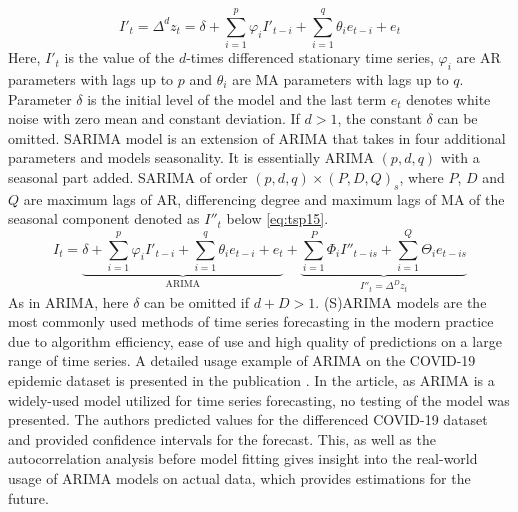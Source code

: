 \documentclass[3p,times,procedia]{elsarticle}
\begin{document}
\begin{enumerate}
\begin{equation} \label{eq:tsp14}
I'_t = \Delta^d z_t = \delta + \sum_{i=1}^p \varphi_i I'_{t-i} + \sum_{i=1}^q \theta_i e_{t-i} + e_t
\end{equation}
Here, $I'_t$ is the value of the $d$-times differenced stationary time series, $\varphi_i$ are AR parameters with lags up to $p$ and $\theta_i$ are MA parameters with lags up to $q$. Parameter $\delta$ is the initial level of the model and the last term $e_t$ denotes white noise with zero mean and constant deviation. If $d>1$, the constant $\delta$ can be omitted.
SARIMA model is an extension of ARIMA that takes in four additional parameters and models seasonality. It is essentially ARIMA $(p,d,q)$ with a seasonal part added. SARIMA of order $(p,d,q)\times (P,D,Q)_s$, where $P$, $D$ and $Q$ are maximum lags of AR, differencing degree and maximum lags of MA of the seasonal component denoted as $I''_t$ below \ref{eq:tsp15}.
\begin{equation} \label{eq:tsp15}
I_t = \underbrace{\delta + \sum_{i=1}^p \varphi_i I'_{t-i} + \sum_{i=1}^q \theta_i e_{t-i} + e_t}_{\mathrm{ARIMA}} + \underbrace{\sum_{i=1}^P \Phi_i I''_{t-is} + \sum_{i=1}^Q \Theta_i e_{t-is}}_{I''_t = \Delta^D z_t}
\end{equation}
As in ARIMA, here $\delta$ can be omitted if $d+D > 1$. (S)ARIMA models are the most commonly used methods of time series forecasting in the modern practice due to algorithm efficiency, ease of use and high quality of predictions on a large range of time series.
A detailed usage example of ARIMA on the COVID-19 epidemic dataset is presented in the publication \cite{benvenuto2020application}. In the article, as ARIMA is a widely-used model utilized for time series forecasting, no testing of the model was presented. The authors predicted values for the differenced COVID-19 dataset and provided confidence intervals for the forecast. This, as well as the autocorrelation analysis before model fitting gives insight into the real-world usage of ARIMA models on actual data, which provides estimations for the future. 
\end{enumerate}
\end{document}
